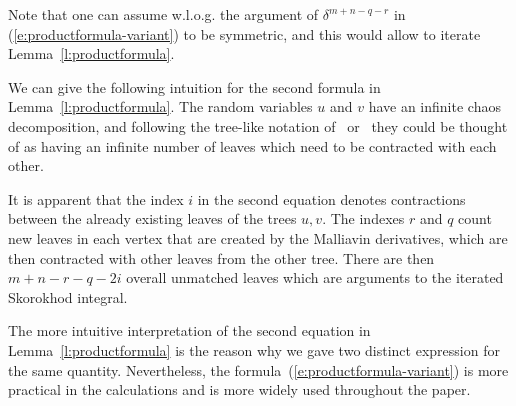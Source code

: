\begin{appendices}
\begin{remark}
  Note that one can assume w.l.o.g. the argument of $\delta^{m + n - q - r}$
  in (\ref{e:productformula-variant}) to be symmetric, and this would allow to
  iterate Lemma~\ref{l:productformula}.
\end{remark}

\begin{remark}
  We can give the following intuition for the second formula in
  Lemma~\ref{l:productformula}. The random variables $u$ and $v$ have an
  infinite chaos decomposition, and following the tree-like notation
  of~{\cite{gubinelli_paracontrolled_2012}} or~{\cite{hairer_theory_2014}}
  they could be thought of as having an infinite number of leaves which need
  to be contracted with each other.
  
  It is apparent that the index $i$ in the second equation denotes
  contractions between the already existing leaves of the trees $u, v$. The
  indexes $r$ and $q$ count new leaves in each vertex that are created by the
  Malliavin derivatives, which are then contracted with other leaves from the
  other tree. There are then $m + n - r - q - 2 i$ overall unmatched leaves
  which are arguments to the iterated Skorokhod integral.
  
  The more intuitive interpretation of the second equation in
  Lemma~\ref{l:productformula} is the reason why we gave two distinct
  expression for the same quantity. Nevertheless, the
  formula~(\ref{e:productformula-variant}) is more practical in the
  calculations and is more widely used throughout the paper.
\end{remark}


\end{appendices}
